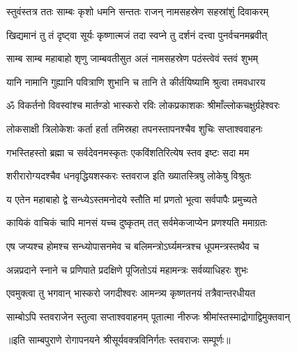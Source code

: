 


\twolineshloka
{स्तुवंस्तत्र ततः साम्बः कृशो धमनि सन्ततः}
{राजन् नामसहस्रेण सहस्रांशुं दिवाकरम्} %

\twolineshloka
{खिद्यमानं तु तं दृष्ट्वा सूर्यः कृष्णात्मजं तदा}
{स्वप्ने तु दर्शनं दत्त्वा पुनर्वचनमब्रवीत्} %


\twolineshloka
{साम्ब साम्ब महाबाहो शृणु जाम्बवतीसुत}
{अलं नामसहस्रेण पठंस्त्वेवं स्तवं शुभम्} %

\twolineshloka
{यानि नामानि गुह्यानि पवित्राणि शुभानि च}
{तानि ते कीर्तयिष्यामि श्रुत्वा तमवधारय} %

\twolineshloka
{ॐ विकर्तनो विवस्वांश्च मार्तण्डो भास्करो रविः}
{लोकप्रकाशकः श्रीमाँल्लोकचक्षुर्ग्रहेश्वरः} %

\twolineshloka
{लोकसाक्षी त्रिलोकेशः कर्ता हर्ता तमिस्रहा}
{तपनस्तापनश्चैव शुचिः सप्ताश्ववाहनः} %

\twolineshloka
{गभस्तिहस्तो ब्रह्मा च सर्वदेवनमस्कृतः}
{एकविंशतिरित्येष स्तव इष्टः सदा मम} %

\twolineshloka
{शरीरारोग्यदश्चैव धनवृद्धियशस्करः}
{स्तवराज इति ख्यातस्त्रिषु लोकेषु विश्रुतः} %

\twolineshloka
{य एतेन महाबाहो द्वे सन्ध्येऽस्तमनोदये}
{स्तौति मां प्रणतो भूत्वा सर्वपापैः प्रमुच्यते} %

\twolineshloka
{कायिकं वाचिकं चापि मानसं यच्च दुष्कृतम्}
{तत् सर्वमेकजाप्येन प्रणश्यति ममाग्रतः} %

\twolineshloka
{एष जप्यश्च होमश्च सन्ध्योपासनमेव च}
{बलिमन्त्रोऽर्घ्यमन्त्रश्च धूपमन्त्रस्तथैव च} %

\twolineshloka
{अन्नप्रदाने स्नाने च प्रणिपाते प्रदक्षिणे}
{पूजितोऽयं महामन्त्रः सर्वव्याधिहरः शुभः} %

\twolineshloka
{एवमुक्त्वा तु भगवान् भास्करो जगदीश्वरः}
{आमन्त्र्य कृष्णतनयं तत्रैवान्तरधीयत} %

\twolineshloka
{साम्बोऽपि स्तवराजेन स्तुत्वा सप्ताश्ववाहनम्}
{पूतात्मा नीरुजः श्रीमांस्तस्माद्रोगाद्विमुक्तवान्} %


॥इति साम्बपुराणे रोगापनयने श्रीसूर्यवक्त्रविनिर्गतः स्तवराजः सम्पूर्णः॥